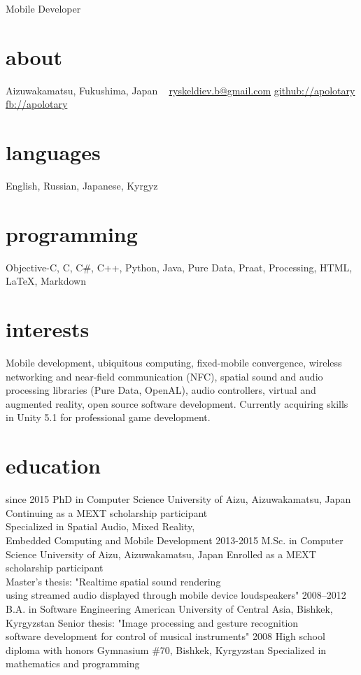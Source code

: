 \documentclass[]{friggeri-cv}
\begin{document}
       {Mobile Developer}

\begin{aside}
  \section{about}
    Aizuwakamatsu,
    Fukushima, Japan
    ~
    \href{mailto:ryskeldiev.b@gmail.com}{ryskeldiev.b@gmail.com}
    \href{https://github.com/Apolotary/}{github://apolotary}
    \href{http://facebook.com/apolotary}{fb://apolotary}
  \section{languages}
	English, Russian,
	Japanese, Kyrgyz
  \section{programming}
	Objective-C, C, C\#,
	C++, Python, Java,
	Pure Data, Praat,
	Processing,
	HTML, LaTeX,
	Markdown
 \end{aside}

\section{interests}

Mobile development, ubiquitous computing, fixed-mobile convergence, wireless networking and near-field communication (NFC), spatial sound and audio processing libraries (Pure Data, OpenAL), audio controllers, virtual and augmented reality, open source software development. Currently acquiring skills in Unity 5.1 for professional game development.
\section{education}

\begin{entrylist}
  \entry
    {since 2015}
    {PhD in Computer Science}
    {University of Aizu, Aizuwakamatsu, Japan}
    {Continuing as a MEXT scholarship participant\\
    Specialized in Spatial Audio, Mixed Reality,\\
    Embedded Computing and Mobile Development}
  \entry
    {2013-2015}
    {M.Sc. in Computer Science}
    {University of Aizu, Aizuwakamatsu, Japan}
    {Enrolled as a MEXT scholarship participant\\
    Master's thesis: "Realtime spatial sound rendering\\
     using streamed audio displayed through mobile device loudspeakers"}
  \entry
    {2008–2012}
    {B.A. in Software Engineering}
    {American University of Central Asia, Bishkek, Kyrgyzstan}
    {Senior thesis: "Image processing and gesture recognition\\
     software development for control of musical instruments"}
  \entry
    {2008}
    {High school diploma with honors}
    {Gymnasium \#70, Bishkek, Kyrgyzstan}
    {Specialized in mathematics and programming}
\end{entrylist}
\end{document}

